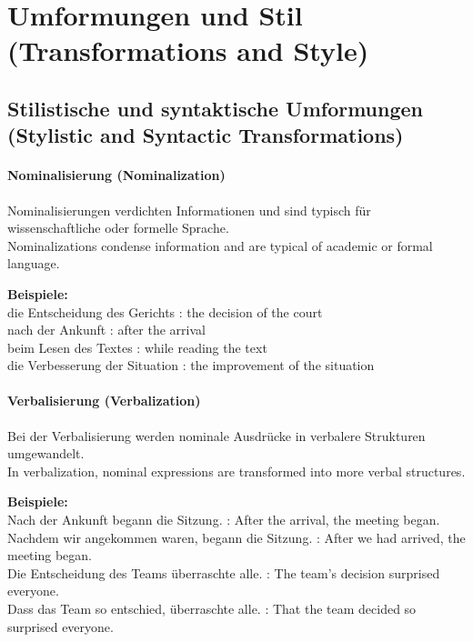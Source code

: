 \documentclass[a4paper]{article}
\begin{document}
    
    \section{Umformungen und Stil {\small (Transformations and Style)}}
    
    \subsection{Stilistische und syntaktische Umformungen {\small (Stylistic and Syntactic Transformations)}}
        
        \paragraph{Nominalisierung {\small (Nominalization)}}
            Nominalisierungen verdichten Informationen und sind typisch für wissenschaftliche oder formelle Sprache.\\
            Nominalizations condense information and are typical of academic or formal language.
            
            \textbf{Beispiele:}\\
            die Entscheidung des Gerichts : the decision of the court\\
            nach der Ankunft : after the arrival\\
            beim Lesen des Textes : while reading the text\\
            die Verbesserung der Situation : the improvement of the situation
        
        \paragraph{Verbalisierung {\small (Verbalization)}}
            Bei der Verbalisierung werden nominale Ausdrücke in verbalere Strukturen umgewandelt.\\
            In verbalization, nominal expressions are transformed into more verbal structures.
            
            \textbf{Beispiele:}\\
            Nach der Ankunft begann die Sitzung. : After the arrival, the meeting began.\\
            Nachdem wir angekommen waren, begann die Sitzung. : After we had arrived, the meeting began.\\
            Die Entscheidung des Teams überraschte alle. : The team's decision surprised everyone.\\
            Dass das Team so entschied, überraschte alle. : That the team decided so surprised everyone.
        
\end{document}
